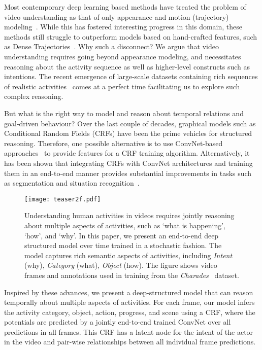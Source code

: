 \documentclass[10pt,twocolumn,letterpaper]{article}
\begin{document}
Most contemporary deep learning based methods have treated the problem of video understanding as that of only appearance and motion (trajectory) modeling~\cite{Simonyan13,Tran15,Georgia15,Snoek16}. While this has fostered interesting progress in this domain, these methods still struggle to outperform models based on hand-crafted features, such as Dense Trajectories~\cite{WangIDT13}. 
Why such a disconnect? We argue that video understanding requires going beyond appearance modeling, and necessitates reasoning about the activity sequence as well as higher-level constructs such as intentions. The recent emergence of large-scale datasets containing rich sequences of realistic activities~\cite{charades,yeung2015every,weinzaepfel2016towards} comes at a perfect time facilitating us to explore such complex reasoning. 

But what is the right way to model and reason about temporal relations and goal-driven behaviour? Over the last couple of decades, graphical models such as Conditional Random Fields (CRFs) have been the prime vehicles for structured reasoning. 
Therefore, one possible alternative is to use ConvNet-based approaches~\cite{alexnet12} to provide features for a CRF training algorithm. 
Alternatively, it has been shown that integrating CRFs with ConvNet architectures and training them in an end-to-end manner provides substantial improvements in tasks such as segmentation and situation recognition~\cite{raqueldense2016,ChenSchwingICML2015,yatskarsituation}. 

\begin{figure}[t]
\texttt{[image: teaser2f.pdf]}
\caption{Understanding human activities in videos requires jointly reasoning about multiple aspects of activities, such as `what is happening', `how', and `why'. In this paper, we present an end-to-end deep structured model over time trained in a stochastic fashion. The model captures rich semantic aspects of activities, including \emph{Intent} (why), \emph{Category} (what), \emph{Object} (how). The figure shows video frames and annotations used in training from the {\em Charades}~\cite{charades} dataset. }
\label{fig:teaser1}
\end{figure}


Inspired by these advances, we present a deep-structured model that can reason temporally about multiple aspects of activities. For each frame, our model infers the activity category, object, action, progress, and scene using a CRF, where the potentials are predicted by a jointly end-to-end trained ConvNet over all predictions in all frames. This CRF has a latent node for the intent of the actor in the video and pair-wise relationships between all individual frame predictions. 
\end{document}
